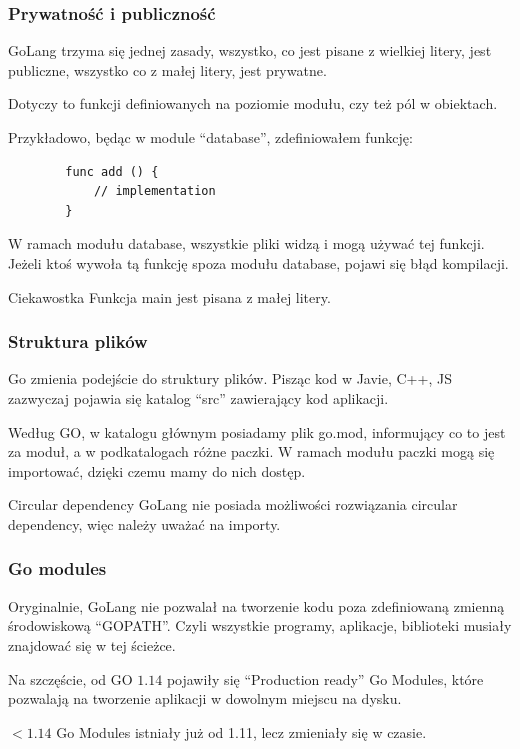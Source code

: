 \documentclass[10pt]{beamer}
\newcommand{\quotes}[1]{``#1''}
\begin{document}
\begin{frame}[fragile]
    \frametitle{Prywatność i publiczność}
    GoLang trzyma się jednej zasady, wszystko, co jest pisane z wielkiej litery,
    jest publiczne, wszystko co z małej litery, jest prywatne.

    Dotyczy to funkcji definiowanych na poziomie modułu, czy też
    pól w obiektach.

    Przykładowo, będąc w module \quotes{database}, zdefiniowałem funkcję:

    \begin{verbatim}
        func add () {
            // implementation
        }
    \end{verbatim}

    W ramach modułu database, wszystkie pliki widzą i mogą używać tej funkcji.
    Jeżeli ktoś wywoła tą funkcję spoza modułu database, pojawi się błąd kompilacji.


    \begin{block}{Ciekawostka}
        Funkcja main jest pisana z małej litery.
    \end{block}
\end{frame}

\begin{frame}[fragile]
    \frametitle{Struktura plików}
    Go zmienia podejście do struktury plików. Pisząc kod w Javie, C++,
    JS zazwyczaj pojawia się katalog \quotes{src} zawierający kod aplikacji.

    Według GO, w katalogu głównym posiadamy plik go.mod, informujący co to jest
    za moduł, a w podkatalogach różne paczki. W ramach modułu paczki mogą się importować,
    dzięki czemu mamy do nich dostęp.

    \begin{alertblock}{Circular dependency}
        GoLang nie posiada możliwości rozwiązania circular dependency, więc
        należy uważać na importy.
    \end{alertblock}
\end{frame}

\begin{frame}[fragile]
    \frametitle{Go modules}
    Oryginalnie, GoLang nie pozwalał na tworzenie kodu poza zdefiniowaną zmienną
    środowiskową \quotes{GOPATH}. Czyli wszystkie programy, aplikacje, biblioteki
    musiały znajdować się w tej ścieżce.

    Na szczęście, od GO $1.14$ pojawiły się \quotes{Production ready} Go Modules,
    które pozwalają na tworzenie aplikacji w dowolnym miejscu na dysku.

    \begin{block}{$< 1.14$}
        Go Modules istniały już od 1.11, lecz zmieniały się w czasie.
    \end{block}
\end{frame}
\end{document}
